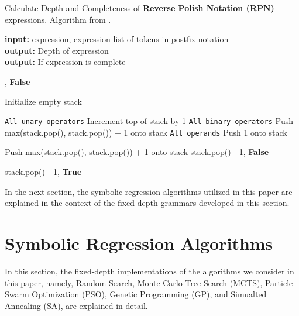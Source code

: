 \documentclass[12pt]{iopart}
\begin{document}
\begin{algorithm}
\scriptsize
\caption{Calculate Depth and Completeness of \textbf{Reverse Polish Notation (RPN)} expressions.  Algorithm from \cite{77128902}.}
\label{alg:getRPNdepth}
\hspace*{\algorithmicindent} \textbf{input:}  expression, expression list of tokens in postfix notation \\
\hspace*{\algorithmicindent} \textbf{output:} Depth of expression\\
\hspace*{\algorithmicindent} \textbf{output:} If expression is complete 
\begin{algorithmic}[1]
        \State {}, \textbf{False}
    \EndIf

    \State Initialize empty stack

         \Comment\texttt{{All unary operators}}
            \State Increment top of stack by 1 
         \Comment\texttt{{All binary operators}}
            \State Push max(stack.pop(), stack.pop()) + 1 onto stack 
        \Else  \Comment\texttt{{All operands}}
            \State Push 1 onto stack
        \EndIf
    \EndFor


	        \State Push max(stack.pop(), stack.pop()) + 1 onto  stack
	    \EndWhile
 	\State \Return stack.pop() - 1, \textbf{False}
    
    \Else
    	\State \Return stack.pop() - 1, \textbf{True}
    	    \EndIf
\EndFunction
\end{algorithmic}
\end{algorithm}

In the next section, the symbolic regression algorithms utilized in this paper are explained in the context of the fixed-depth grammars developed in this section.

\section{Symbolic Regression Algorithms}\label{sec:SymbolicRegressionAlgorithms}

In this section, the fixed-depth implementations of the algorithms we consider in this paper, namely, Random Search, Monte Carlo Tree Search (MCTS), Particle Swarm Optimization (PSO), Genetic Programming (GP), and Simualted Annealing (SA), are explained in detail.
\end{document}
